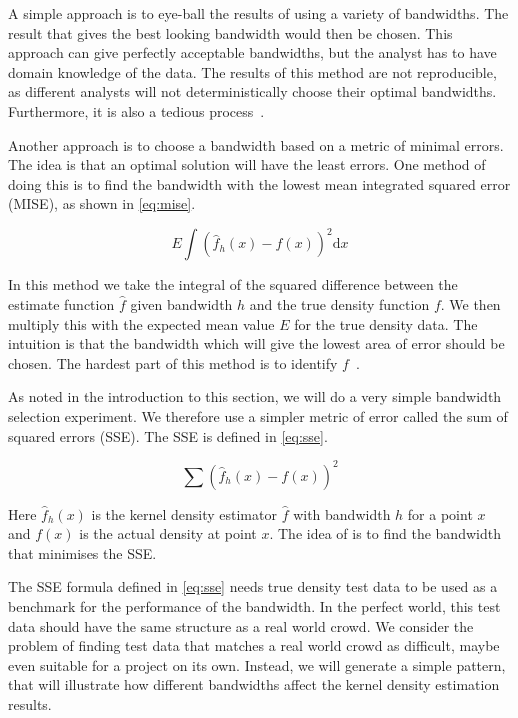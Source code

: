 A simple approach is to eye-ball the results of using a variety of bandwidths. The result that gives the best looking bandwidth would then be chosen. This approach can give perfectly acceptable bandwidths, but the analyst has to have domain knowledge of the data. The results of this method are not reproducible, as different analysts will not deterministically choose their optimal bandwidths. Furthermore, it is also a tedious process~\cite{masteropgave}.

Another approach is to choose a bandwidth based on a metric of minimal errors. The idea is that an optimal solution will have the least errors. One method of doing this is to find the bandwidth with the lowest mean integrated squared error (MISE), as shown in \cref{eq:mise}.

\begin{equation}\label{eq:mise}
     E \int(\hat f_{h}(x) - f(x) )^2\mathrm{d}x
\end{equation}

In this method we take the integral of the squared difference between the estimate function $\hat f$ given bandwidth $h$ and the true density function $f$. We then multiply this with the expected mean value $E$ for the true density data. The intuition is that the bandwidth which will give the lowest area of error should be chosen. The hardest part of this method is to identify $f$~\cite{masteropgave}.

As noted in the introduction to this section, we will do a very simple bandwidth selection experiment. We therefore use a simpler metric of error called the sum of squared errors (SSE). The SSE is defined in \cref{eq:sse}.

\begin{equation}\label{eq:sse}
    \sum (\hat f_{h}(x) - f(x) )^2
\end{equation}

Here $\hat f_{h}(x)$ is the kernel density estimator $\hat f$ with bandwidth $h$ for a point $x$  and $f(x)$ is the actual density at point $x$. The idea of is to find the bandwidth that minimises the SSE.

The SSE formula defined in \cref{eq:sse} needs true density test data to be used as a benchmark for the performance of the bandwidth. In the perfect world, this test data should have the same structure as a real world crowd. We consider the problem of finding test data that matches a real world crowd as difficult, maybe even suitable for a project on its own. Instead, we will generate a simple pattern, that will illustrate how different bandwidths affect the kernel density estimation results.

